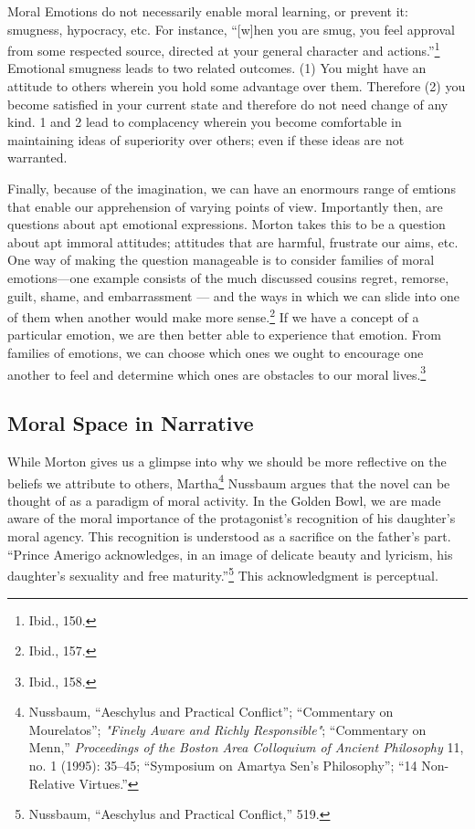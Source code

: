 \documentclass[
  12pt,
]{book}
\theoremstyle{definition}
\theoremstyle{definition}
\theoremstyle{definition}
\theoremstyle{definition}
\theoremstyle{remark}
\begin{document}
Moral Emotions do not necessarily enable moral learning, or prevent it: smugness, hypocracy, etc. For instance, ``{[}w{]}hen you are smug, you feel approval from some respected source, directed at your general character and actions.''\footnote{Ibid., 150.} Emotional smugness leads to two related outcomes. (1) You might have an attitude to others wherein you hold some advantage over them. Therefore (2) you become satisfied in your current state and therefore do not need change of any kind. 1 and 2 lead to complacency wherein you become comfortable in maintaining ideas of superiority over others; even if these ideas are not warranted.

Finally, because of the imagination, we can have an enormours range of emtions that enable our apprehension of varying points of view. Importantly then, are questions about apt emotional expressions. Morton takes this to be a question about apt immoral attitudes; attitudes that are harmful, frustrate our aims, etc. One way of making
the question manageable is to consider families of moral emotions---one example consists of the much discussed cousins regret, remorse, guilt, shame, and embarrassment --- and the ways in which we can slide into one of them when another would make more sense.\footnote{Ibid., 157.} If we have a concept of a particular emotion, we are then better able to experience that emotion. From families of emotions, we can choose which ones we ought to encourage one another to feel and determine which ones are obstacles to our moral lives.\footnote{Ibid., 158.}

\subsection*{Moral Space in Narrative}\label{moral-space-in-narrative}

While Morton gives us a glimpse into why we should be more reflective on the beliefs we attribute to others, Martha\footnote{Nussbaum, {``Aeschylus and Practical Conflict''}; {``Commentary on {Mourelatos}''}; \emph{"{Finely Aware} and {Richly Responsible}"}; {``Commentary on {Menn},''} \emph{Proceedings of the Boston Area Colloquium of Ancient Philosophy} 11, no. 1 (1995): 35--45; {``Symposium on {Amartya Sen}'s Philosophy''}; {``14 {Non-Relative Virtues}.''}} Nussbaum argues that the novel can be thought of as a paradigm of moral activity. In the Golden Bowl, we are made aware of the moral importance of the protagonist's recognition of his daughter's moral agency. This recognition is understood as a sacrifice on the father's part. ``Prince Amerigo acknowledges, in an image of delicate beauty and lyricism, his daughter's sexuality and free maturity.''\footnote{Nussbaum, {``Aeschylus and Practical Conflict,''} 519.} This acknowledgment is perceptual.
\end{document}

